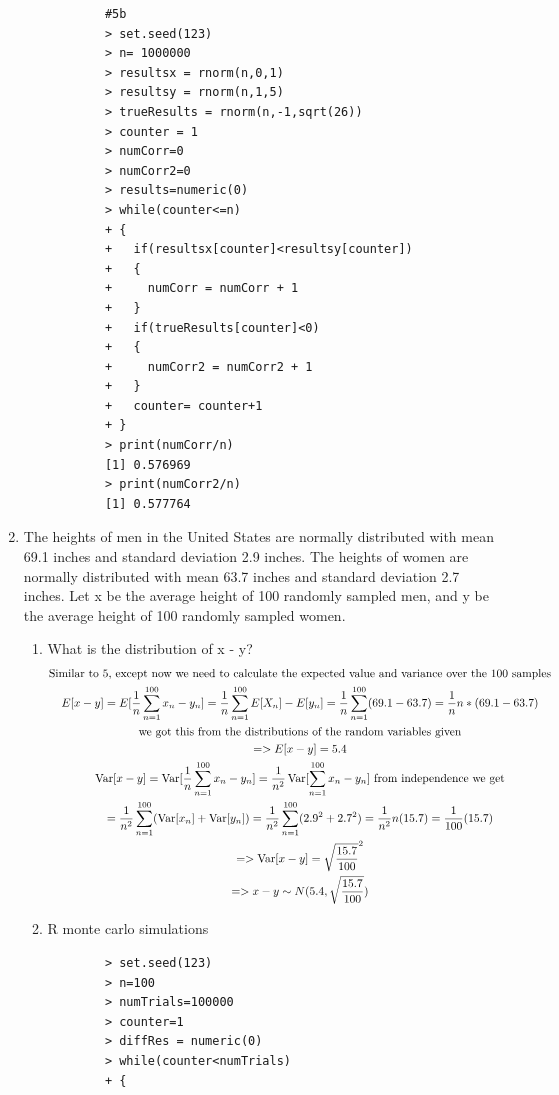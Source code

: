 \documentclass[11pt]{article}
\newcommand{\Var}{\mathop{\rm Var}}
\begin{document}
\begin{enumerate}
\begin{enumerate}
	\begin{verbatim}
		#5b
		> set.seed(123)
		> n= 1000000
		> resultsx = rnorm(n,0,1)
		> resultsy = rnorm(n,1,5)
		> trueResults = rnorm(n,-1,sqrt(26))
		> counter = 1
		> numCorr=0
		> numCorr2=0
		> results=numeric(0) 
		> while(counter<=n)
		+ {
		+   if(resultsx[counter]<resultsy[counter])
		+   {
		+     numCorr = numCorr + 1
		+   }
		+   if(trueResults[counter]<0)
		+   {
		+     numCorr2 = numCorr2 + 1
		+   }
		+   counter= counter+1
		+ }
		> print(numCorr/n)
		[1] 0.576969
		> print(numCorr2/n)
		[1] 0.577764
	\end{verbatim}
\end{enumerate}
\item The heights of men in the United States are normally distributed with mean 69.1 inches and standard deviation
2.9 inches. The heights of women are normally distributed with mean 63.7 inches and standard deviation 2.7 inches. Let x be the average height of 100 randomly sampled men, and y be the average height
of 100 randomly sampled women.
\begin{enumerate}
	\item What is the distribution of x - y?
	\begin{gather}
		\text{Similar to 5, except now we need to calculate the expected value and variance over the 100 samples}\\
		E[x-y] = E[\frac{1}{n}\sum_{n=1}^{100} x_n-y_n] =\frac{1}{n}\sum_{n=1}^{100} E[X_n] - E[y_n] =\frac{1}{n}\sum_{n=1}^{100} (69.1-63.7) = \frac{1}{n} n*(69.1-63.7) \\
		\text{we got this from the distributions of the random variables given}\\
		=> E[x-y] = 5.4\\
		\Var[x-y] = \Var[\frac{1}{n}\sum_{n=1}^{100} x_n-y_n] =\frac{1}{n^2}\Var[\sum_{n=1}^{100} x_n-y_n] \text{ from independence we get}\\
		= \frac{1}{n^2}\sum_{n=1}^{100} (\Var[x_n]+\Var[y_n]) = \frac{1}{n^2}\sum_{n=1}^{100} (2.9^2+2.7^2) = \frac{1}{n^2}n (15.7) = \frac{1}{100}(15.7) \\
		=> \Var[x-y] = \sqrt{\frac{15.7}{100}}^2\\
		=>
		x-y \sim N(5.4,\sqrt{\frac{15.7}{100}})
	\end{gather}
	\item R monte carlo simulations 
	\begin{verbatim}
		> set.seed(123)
		> n=100
		> numTrials=100000
		> counter=1
		> diffRes = numeric(0)
		> while(counter<numTrials)
		+ {

\end{verbatim}
\end{enumerate}
\end{enumerate}
\end{document}
